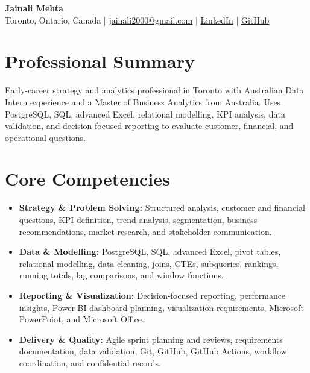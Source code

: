 \documentclass[letterpaper,10pt]{article}
\begin{document}
\begin{center}
  {\fontsize{17}{19}\selectfont\textbf{Jainali Mehta}}\\[2pt]
  \small Toronto, Ontario, Canada \;|\;
  \href{mailto:jainali2000@gmail.com}{jainali2000@gmail.com} \;|\;
  \href{https://www.linkedin.com/in/jainali-mehta}{LinkedIn} \;|\;
  \href{https://github.com/jainalimehta}{GitHub}
\end{center}
\vspace{-7pt}

\section{Professional Summary}
\small Early-career strategy and analytics professional in Toronto with Australian Data Intern experience and a Master of Business Analytics from Australia. Uses PostgreSQL, SQL, advanced Excel, relational modelling, KPI analysis, data validation, and decision-focused reporting to evaluate customer, financial, and operational questions.

\section{Core Competencies}
\begin{itemize}[leftmargin=0.16in,label=\textbullet,topsep=0pt,itemsep=1pt,parsep=0pt]
  \item \small \textbf{Strategy \& Problem Solving:} Structured analysis, customer and financial questions, KPI definition, trend analysis, segmentation, business recommendations, market research, and stakeholder communication.
  \item \small \textbf{Data \& Modelling:} PostgreSQL, SQL, advanced Excel, pivot tables, relational modelling, data cleaning, joins, CTEs, subqueries, rankings, running totals, lag comparisons, and window functions.
  \item \small \textbf{Reporting \& Visualization:} Decision-focused reporting, performance insights, Power BI dashboard planning, visualization requirements, Microsoft PowerPoint, and Microsoft Office.
  \item \small \textbf{Delivery \& Quality:} Agile sprint planning and reviews, requirements documentation, data validation, Git, GitHub, GitHub Actions, workflow coordination, and confidential records.
\end{itemize}
\end{document}
